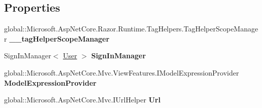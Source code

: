 \subsection*{Properties}
\begin{DoxyCompactItemize}
\item 
\mbox{\label{class_projeto_e_s_w_1_1_areas_1_1_identity_1_1_pages_1_1_account_1_1_manage_1_1_areas___identity9df048355e46256b00c921251d1ec8a1_af6237e982b4dedd9d0b78ae43a661bc0}} 
global\+::\+Microsoft.\+Asp\+Net\+Core.\+Razor.\+Runtime.\+Tag\+Helpers.\+Tag\+Helper\+Scope\+Manager {\bfseries \+\_\+\+\_\+tag\+Helper\+Scope\+Manager}
\item 
\mbox{\label{class_projeto_e_s_w_1_1_areas_1_1_identity_1_1_pages_1_1_account_1_1_manage_1_1_areas___identity9df048355e46256b00c921251d1ec8a1_afca97c5e8540df5b06135ad2f04b24d6}} 
Sign\+In\+Manager$<$ \mbox{\hyperlink{class_projeto_e_s_w_1_1_models_1_1_user}{User}} $>$ {\bfseries Sign\+In\+Manager}
\item 
\mbox{\label{class_projeto_e_s_w_1_1_areas_1_1_identity_1_1_pages_1_1_account_1_1_manage_1_1_areas___identity9df048355e46256b00c921251d1ec8a1_a9d74c4dca8b0538a1e90531e49b49628}} 
global\+::\+Microsoft.\+Asp\+Net\+Core.\+Mvc.\+View\+Features.\+I\+Model\+Expression\+Provider {\bfseries Model\+Expression\+Provider}
\item 
\mbox{\label{class_projeto_e_s_w_1_1_areas_1_1_identity_1_1_pages_1_1_account_1_1_manage_1_1_areas___identity9df048355e46256b00c921251d1ec8a1_a388c1d2136b53a2f7d9d2655b9ac4b0a}} 
global\+::\+Microsoft.\+Asp\+Net\+Core.\+Mvc.\+I\+Url\+Helper {\bfseries Url}

\end{DoxyCompactItemize}
